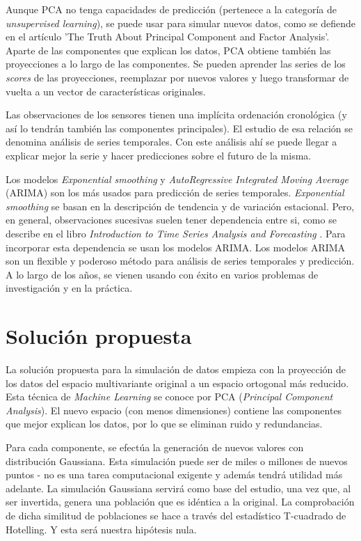 \documentclass[11pt,spanish,listoffigures,listoftables]{tfgetsinf}
\begin{document}
Aunque PCA no tenga capacidades de predicción (pertenece a la categoría de {\em unsupervised learning}), se puede usar para simular nuevos datos, como se defiende en el artículo 'The Truth About Principal Component and Factor Analysis'. Aparte de las componentes que explican los datos, PCA obtiene también las proyecciones a lo largo de las componentes. Se pueden aprender las series de los {\em scores} de las proyecciones, reemplazar por nuevos valores y luego transformar de vuelta a un vector de características originales.

Las observaciones de los sensores tienen una implícita ordenación cronológica (y así lo tendrán también las componentes principales). El estudio de esa relación se denomina análisis de series temporales. Con este análisis ahí se puede llegar a explicar mejor la serie y hacer predicciones sobre el futuro de la misma. 

Los modelos {\em Exponential smoothing} y {\em AutoRegressive Integrated Moving Average} (ARIMA) son los más usados para predicción de series temporales. {\em Exponential smoothing} se basan en la descripción de tendencia y de variación estacional. Pero, en general, observaciones sucesivas suelen tener dependencia entre si, como se describe en el libro \textit{Introduction to Time Series Analysis and Forecasting} \cite{montgomery}. Para incorporar esta dependencia se usan los modelos ARIMA. Los modelos ARIMA son un flexible y poderoso método para análisis de series temporales y predicción. A lo largo de los años, se vienen usando con éxito en varios problemas de investigación y en la práctica.

\chapter{Solución propuesta}
La solución propuesta para la simulación de datos empieza con la proyección de los datos del espacio multivariante original a un espacio ortogonal más reducido. Esta técnica de {\em Machine Learning} se conoce por PCA ({\em Principal Component Analysis}). El nuevo espacio (con menos dimensiones) contiene las componentes que mejor explican los datos, por lo que se eliminan ruido y redundancias. 

Para cada componente, se efectúa la generación de nuevos valores con distribución Gaussiana. Esta simulación puede ser de miles o millones de nuevos puntos - no es una tarea computacional exigente y además tendrá utilidad más adelante. La simulación Gaussiana servirá como base del estudio, una vez que, al ser invertida, genera una población que es idéntica a la original. La comprobación de dicha similitud de poblaciones se hace a través del estadístico T-cuadrado de Hotelling. Y esta será nuestra hipótesis nula.
\end{document}
